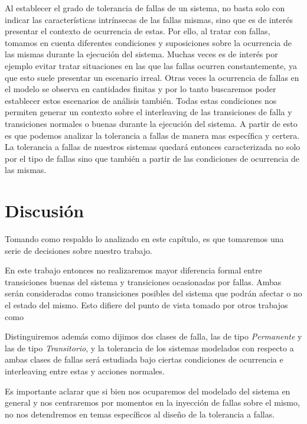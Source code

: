 \documentclass[titlepage, 12pt]{book}
\begin{document}
Al establecer el grado de tolerancia de fallas de un sistema, no basta solo con indicar las caracter\'isticas intr\'insecas de las fallas mismas, sino que es de inter\'es presentar el contexto de ocurrencia de estas. Por ello, al tratar con fallas, tomamos en cuenta diferentes condiciones y suposiciones sobre la ocurrencia de las mismas durante la ejecuci\'on del sistema. Muchas veces es de inter\'es por ejemplo evitar tratar situaciones en las que las fallas ocurren constantemente, ya que esto suele presentar un escenario irreal. Otras veces la ocurrencia de fallas en el modelo se observa en cantidades finitas y por lo tanto buscaremos poder establecer estos escenarios de an\'alisis tambi\'en. Todas estas condiciones nos permiten generar un contexto sobre el interleaving de las transiciones de falla y transiciones normales o buenas durante la ejecuci\'on del sistema. A partir de esto es que podemos analizar la tolerancia a fallas de manera mas espec\'ifica y certera. La tolerancia a fallas de nuestros sistemas quedar\'a entonces caracterizada no solo por el tipo de fallas sino que tambi\'en a partir de las condiciones de ocurrencia de las mismas.






\section{Discusi\'on}
Tomando como respaldo lo analizado en este cap\'itulo, es que tomaremos una serie de decisiones sobre nuestro trabajo.

En este trabajo entonces no realizaremos mayor diferencia formal entre transiciones buenas del sistema y transiciones ocasionadas por fallas. Ambas ser\'an consideradas como transiciones posibles del sistema que podr\'an afectar o no el estado del mismo. Esto difiere del punto de vista tomado por otros trabajos como \cite[etc...]{Arora,dCTL}

Distinguiremos adem\'as como dijimos dos clases de falla, las de tipo \textit{Permanente} y las de tipo \textit{Transitorio}, y la tolerancia de los sistemas modelados con respecto a ambas clases de fallas ser\'a estudiada bajo ciertas condiciones de ocurrencia e interleaving entre estas y acciones normales.

Es importante aclarar que si bien nos ocuparemos del modelado del sistema en general y nos centraremos por momentos en la inyecci\'on de fallas sobre el mismo, no nos detendremos en temas espec\'ificos al dise\~no de la tolerancia a fallas.
\end{document}
